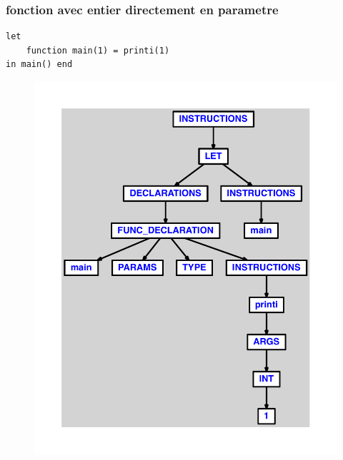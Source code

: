 \documentclass{article}
\begin{document}
\subsubsection{fonction avec entier directement en parametre}
\begin{lstlisting}
let
	function main(1) = printi(1)
in main() end
\end{lstlisting}
\newpage
\begin{figure}[H]
\centering
\includegraphics[max width=\textwidth]{ast/ast_228.pdf}
\end{figure}
\newpage
\end{document}
